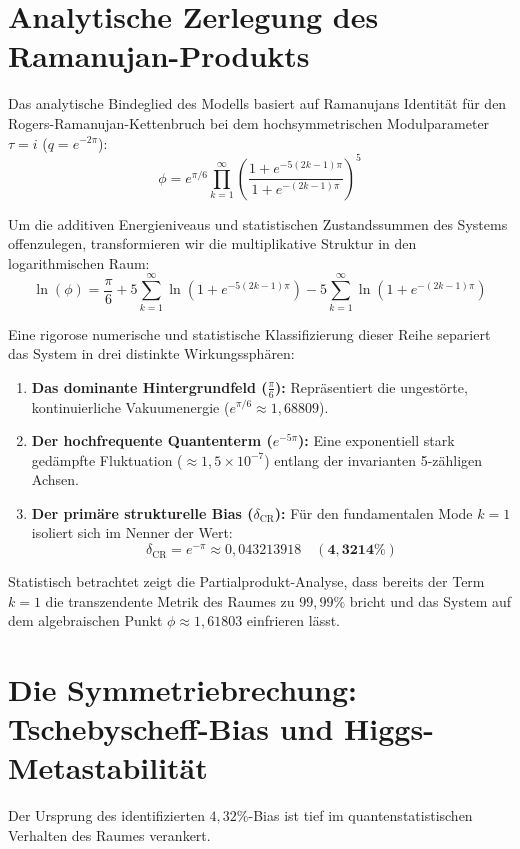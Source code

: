\documentclass[11pt,a4paper,twocolumn]{article}
\newcommand{\bias}{\delta_{\text{CR}}}
\begin{document}
	\section{Analytische Zerlegung des Ramanujan-Produkts}
	Das analytische Bindeglied des Modells basiert auf Ramanujans Identität für den Rogers-Ramanujan-Kettenbruch bei dem hochsymmetrischen Modulparameter $\tau = i$ ($q = e^{-2\pi}$):
	\begin{equation}
		\phi = e^{\pi/6} \prod_{k=1}^{\infty} \left( \frac{1 + e^{-5(2k-1)\pi}}{1 + e^{-(2k-1)\pi}} \right)^{5}
	\end{equation}
	
	Um die additiven Energieniveaus und statistischen Zustandssummen des Systems offenzulegen, transformieren wir die multiplikative Struktur in den logarithmischen Raum:
	\begin{equation}
		\ln(\phi) = \frac{\pi}{6} + 5 \sum_{k=1}^{\infty} \ln(1 + e^{-5(2k-1)\pi}) - 5 \sum_{k=1}^{\infty} \ln(1 + e^{-(2k-1)\pi})
	\end{equation}
	
	Eine rigorose numerische und statistische Klassifizierung dieser Reihe separiert das System in drei distinkte Wirkungssphären:
	\begin{enumerate}
		\item \textbf{Das dominante Hintergrundfeld ($\frac{\pi}{6}$):} Repräsentiert die ungestörte, kontinuierliche Vakuumenergie ($e^{\pi/6} \approx 1{,}68809$).
		\item \textbf{Der hochfrequente Quantenterm ($e^{-5\pi}$):} Eine exponentiell stark gedämpfte Fluktuation ($\approx 1{,}5 \times 10^{-7}$) entlang der invarianten 5-zähligen Achsen.
		\item \textbf{Der primäre strukturelle Bias ($\bias$):} Für den fundamentalen Mode $k=1$ isoliert sich im Nenner der Wert:
		\begin{equation}
			\bias = e^{-\pi} \approx 0{,}043213918 \quad (\mathbf{4{,}3214\%})
		\end{equation}
	\end{enumerate}
	
	Statistisch betrachtet zeigt die Partialprodukt-Analyse, dass bereits der Term $k=1$ die transzendente Metrik des Raumes zu $99{,}99\%$ bricht und das System auf dem algebraischen Punkt $\phi \approx 1{,}61803$ einfrieren lässt.
	
	\section{Die Symmetriebrechung: Tschebyscheff-Bias und Higgs-Metastabilität}
	Der Ursprung des identifizierten $4{,}32\%$-Bias ist tief im quantenstatistischen Verhalten des Raumes verankert.
	
\end{document}
